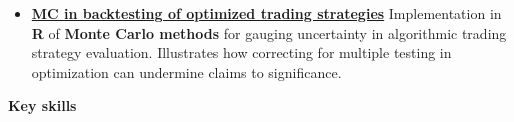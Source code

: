 \documentclass[10pt, a4paper]{article}
\begin{document}
\begin{itemize} [leftmargin=*]



\normalsize 
\item 	\href{https://rfl-urbaniak.github.io/backtesting/}{
	\textbf{MC in backtesting of optimized trading strategies}} 
\newline  \scriptsize  Implementation in \textbf{\textsf{R}} of \textbf{Monte Carlo methods} for gauging uncertainty in algorithmic trading strategy evaluation. Illustrates how correcting for multiple testing in optimization can undermine claims to significance.





\end{itemize}




\vspace{2mm}	
\textbf{{\sc \Large Key skills}}\\

\vspace{-4mm}
\end{document}

